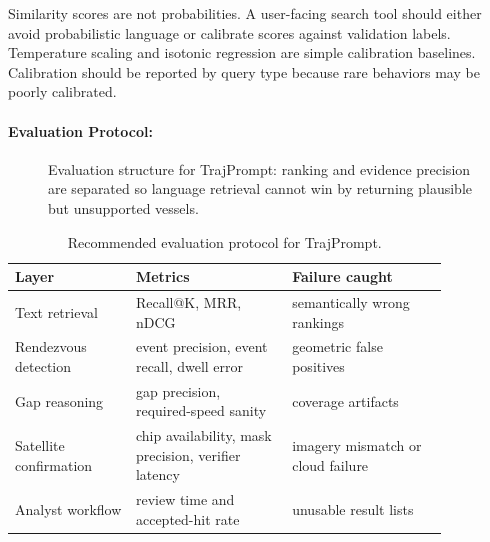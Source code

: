 \documentclass{article}
\begin{document}
Similarity scores are not probabilities. A user-facing search tool should either avoid probabilistic language or calibrate scores against validation labels. Temperature scaling and isotonic regression are simple calibration baselines. Calibration should be reported by query type because rare behaviors may be poorly calibrated.

\paragraph{Evaluation Protocol:}

\begin{figure}[t]
\centering
{}
\caption{Evaluation structure for TrajPrompt: ranking and evidence precision are separated so language retrieval cannot win by returning plausible but unsupported vessels.}
\label{fig:trajprompt-eval}
\end{figure}

\begin{table}[t]
\centering
\caption{Recommended evaluation protocol for TrajPrompt.}
\label{tab:traj_protocol}
\begin{tabular}{@{}p{0.24\linewidth}p{0.31\linewidth}p{0.31\linewidth}@{}}
\toprule
\textbf{Layer} & \textbf{Metrics} & \textbf{Failure caught}\\
\midrule
Text retrieval & Recall@K, MRR, nDCG & semantically wrong rankings\\
Rendezvous detection & event precision, event recall, dwell error & geometric false positives\\
Gap reasoning & gap precision, required-speed sanity & coverage artifacts\\
Satellite confirmation & chip availability, mask precision, verifier latency & imagery mismatch or cloud failure\\
Analyst workflow & review time and accepted-hit rate & unusable result lists\\
\bottomrule
\end{tabular}
\end{table}
\end{document}
